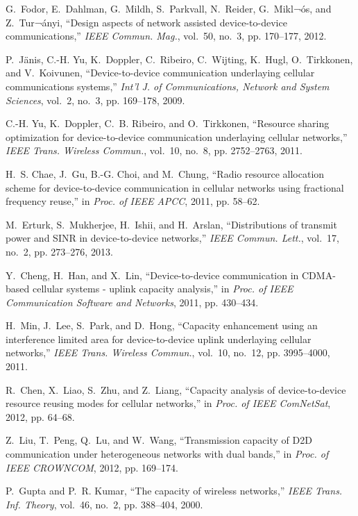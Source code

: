 \documentclass[journal, 10pt]{IEEEtran}
\begin{document}
\begin{thebibliography}{10}
G.~Fodor, E.~Dahlman, G.~Mildh, S.~Parkvall, N.~Reider, G.~Mikl¬ós, and
  Z.~Tur¬ányi, ``Design aspects of network assisted device-to-device
  communications,'' \emph{{IEEE} Commun. Mag.}, vol.~50, no.~3, pp. 170--177,
  2012.

P.~J{\"a}nis, C.-H. Yu, K.~Doppler, C.~Ribeiro, C.~Wijting, K.~Hugl,
  O.~Tirkkonen, and V.~Koivunen, ``Device-to-device communication underlaying
  cellular communications systems,'' \emph{Int'l J. of Communications, Network
  and System Sciences}, vol.~2, no.~3, pp. 169--178, 2009.

C.-H. Yu, K.~Doppler, C.~B. Ribeiro, and O.~Tirkkonen, ``Resource sharing
  optimization for device-to-device communication underlaying cellular
  networks,'' \emph{{IEEE} Trans. Wireless Commun.}, vol.~10, no.~8, pp.
  2752--2763, 2011.

H.~S. Chae, J.~Gu, B.-G. Choi, and M.~Chung, ``Radio resource allocation scheme
  for device-to-device communication in cellular networks using fractional
  frequency reuse,'' in \emph{Proc. of IEEE APCC}, 2011, pp. 58--62.

M.~Erturk, S.~Mukherjee, H.~Ishii, and H.~Arslan, ``Distributions of transmit
  power and {SINR} in device-to-device networks,'' \emph{{IEEE} Commun. Lett.},
  vol.~17, no.~2, pp. 273--276, 2013.

Y.~Cheng, H.~Han, and X.~Lin, ``Device-to-device communication in {CDMA}-based
  cellular systems - uplink capacity analysis,'' in \emph{Proc. of IEEE
  Communication Software and Networks}, 2011, pp. 430--434.

H.~Min, J.~Lee, S.~Park, and D.~Hong, ``Capacity enhancement using an
  interference limited area for device-to-device uplink underlaying cellular
  networks,'' \emph{{IEEE} Trans. Wireless Commun.}, vol.~10, no.~12, pp.
  3995--4000, 2011.

R.~Chen, X.~Liao, S.~Zhu, and Z.~Liang, ``Capacity analysis of device-to-device
  resource reusing modes for cellular networks,'' in \emph{Proc. of IEEE
  ComNetSat}, 2012, pp. 64--68.

Z.~Liu, T.~Peng, Q.~Lu, and W.~Wang, ``Transmission capacity of {D2D}
  communication under heterogeneous networks with dual bands,'' in \emph{Proc.
  of IEEE CROWNCOM}, 2012, pp. 169--174.

P.~Gupta and P.~R. Kumar, ``{The capacity of wireless networks},'' \emph{{IEEE}
  Trans. Inf. Theory}, vol.~46, no.~2, pp. 388--404, 2000.


\end{thebibliography}
\end{document}
